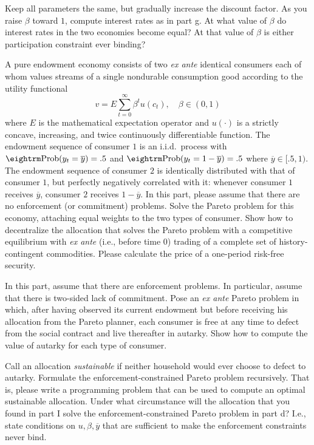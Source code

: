 \medskip
{}   Keep all parameters the same, but gradually
increase the discount factor.   As you raise $\beta$ toward
$1$, compute interest rates
 as in part g.  At  what value of $\beta$ do interest rates
in the two economies become equal? At that value of $\beta$
is either participation constraint ever binding?


\bigskip
{} 
\medskip
\noindent A pure endowment  economy consists of two {\it
ex ante\/} identical consumers each of whom values streams of a
single nondurable consumption good according to the utility
functional
$$ v= E \sum_{t=0}^\infty \beta^t u(c_t), \quad \beta
\in (0,1)   $$ where $E$  is the mathematical expectation
operator and $u(\cdot)$ is a strictly concave, increasing, and
twice continuously differentiable function. The endowment sequence
 of consumer $1$ is an i.i.d.\ process with ${\rm Prob} (y_t =
 \overline y )=.5$ and ${\rm Prob} (y_t =
 1-\overline y )=.5$ where $\overline y \in [.5,1)$.  The
 endowment sequence of consumer $2$ is identically distributed
 with that of consumer $1$, but perfectly negatively correlated
 with it: whenever consumer $1$ receives $\overline y$, consumer
 $2$ receives $1 -\overline y$.\vfil\eject
 \medskip
 \medskip
 \noindent In this part, please assume that
there are no enforcement (or commitment) problems.
 \medskip
  Solve the Pareto problem for this economy,
 attaching equal weights to the two types of consumer.
 \medskip
   Show how to decentralize the allocation that
 solves the Pareto problem with a competitive equilibrium with
 {\it ex ante\/} (i.e., before time $0$) trading of a complete set
 of
 history-contingent commodities. Please calculate the
 price of a one-period risk-free security.

 \medskip
 \medskip
 \noindent
In this part, assume that there are enforcement problems. In
particular, assume that there is two-sided lack of
 commitment.
 \medskip
  Pose an {\it ex ante\/} Pareto problem in which,
 after having observed its current
 endowment but before receiving his allocation from the Pareto
 planner, each
 consumer is free at any time to defect from the social contract and live thereafter in
 autarky.  Show how to compute the value of autarky for each type of consumer.

 \medskip{}
 Call an allocation {\it sustainable\/} if neither
 household would ever choose to defect to autarky.
Formulate the enforcement-constrained Pareto problem
 recursively.  That is, please write a programming problem  that can be used to
 compute an optimal sustainable allocation.
 \medskip
   Under what circumstance will the allocation
 that you found in part I solve the enforcement-constrained Pareto
 problem in part d?  I.e., state conditions on $u, \beta,
 \overline y$ that are sufficient to make the enforcement
 constraints never bind.

